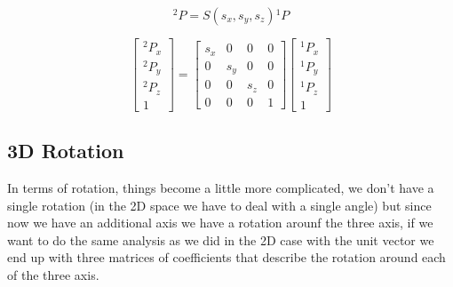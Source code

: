 \[
  {}^2P = S(s_x, s_y, s_z) {}^1P 
\]

\[
    \begin{bmatrix}
        {}^2P_x \\
        {}^2P_y \\
        {}^2P_z \\
        1
    \end{bmatrix}
    =
    \begin{bmatrix}
        s_x & 0 & 0 & 0 \\
        0 & s_y & 0 & 0 \\
        0 & 0 & s_z & 0 \\
        0 & 0 & 0 & 1
    \end{bmatrix}
    \begin{bmatrix}
        {}^1P_x \\
        {}^1P_y \\
        {}^1P_z \\
        1
    \end{bmatrix}   
\]

\subsection{3D Rotation}

In terms of rotation, things become a little more complicated, we don't have a single rotation (in the 2D space we have to deal with a single angle) but since now we have an additional axis we have a rotation arounf the three axis, if we want to do the same analysis as we did in the 2D case with the unit vector we end up with three matrices of coefficients that describe the rotation around each of the three axis.

